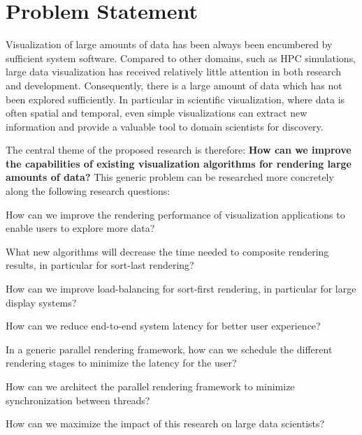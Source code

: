 
 \chapter{Problem Statement}

 Visualization of large amounts of data has been always been encumbered by
 sufficient system software. Compared to other domains, such as HPC simulations,
 large data visualization has received relatively little attention in both
 research and development. Consequently, there is a large amount of data which
 has not been explored sufficiently. In particular in scientific visualization,
 where data is often spatial and temporal, even simple visualizations can extract
 new information and provide a valuable tool to domain scientists for discovery.

 The central theme of the proposed research is therefore: {\bf How can we improve
 the capabilities of existing visualization algorithms for rendering large
 amounts of data?} This generic problem can be researched more concretely along
 the following research questions:
 \begin{compactenum}
  \item How can we improve the rendering performance of visualization applications to enable users to explore more data?
  \begin{compactenum}
   \item What new algorithms will decrease the time needed to composite rendering results, in particular for sort-last rendering?
   \item How can we improve load-balancing for sort-first rendering, in particular for large display systems?
  \end{compactenum}
  \item How can we reduce end-to-end system latency for better user experience?
  \begin{compactenum}
   \item In a generic parallel rendering framework, how can we schedule the different rendering stages to minimize the latency for the user?
   \item How can we architect the parallel rendering framework to minimize synchronization between threads?
  \end{compactenum}
  \item How can we maximize the impact of this research on large data scientists?
 \end{compactenum}

